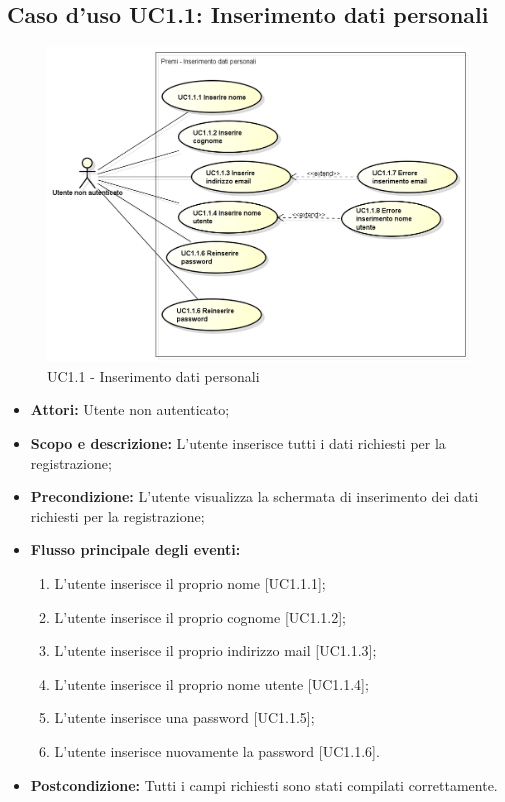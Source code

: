 \newpage

\subsection{Caso d'uso UC1.1: Inserimento dati personali}
\begin{figure}[h] 
	\centering 
	\includegraphics[scale=0.45] {img/UC1.1.png} 
	\caption{UC1.1 - Inserimento dati personali} 
\end{figure}
\begin{itemize}
	\item \textbf{Attori:} Utente non autenticato;
	\item \textbf{Scopo e descrizione:} L'utente inserisce tutti i dati richiesti per la registrazione;
	\item \textbf{Precondizione:} L'utente visualizza la schermata di inserimento dei dati richiesti per la registrazione;
	\item \textbf{Flusso principale degli eventi:}
	\begin{enumerate}
		\item L'utente inserisce il proprio nome [UC1.1.1];
		\item L'utente inserisce il proprio cognome [UC1.1.2];
		\item L'utente inserisce il proprio indirizzo mail [UC1.1.3];
		\item L'utente inserisce il proprio nome utente [UC1.1.4];
		\item L'utente inserisce una password [UC1.1.5];
		\item L'utente inserisce nuovamente la password [UC1.1.6].
	\end{enumerate}
	\item \textbf{Postcondizione:} Tutti i campi richiesti sono stati compilati correttamente.
\end{itemize}

